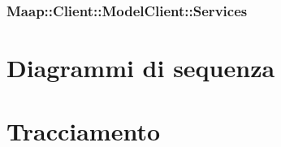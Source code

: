 \subsubsection{Maap::Client::ModelClient::Services}


\newpage
\section{Diagrammi di sequenza}


\appendix
\newpage

\section{Tracciamento}








